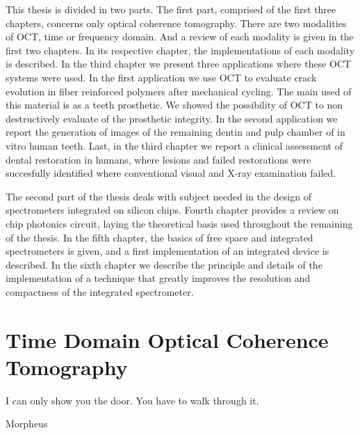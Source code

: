 \documentclass[12pt,twoside,english]{book}
\renewcommand{\~}{\perispomeni}%
\numberwithin{equation}{section}
\numberwithin{figure}{section}
\begin{document}
This thesis is divided in two parts. The first part, comprised of the first three chapters, concerns only optical coherence tomography. There are two modalities of OCT, time or frequency domain. And a review of each modality is given in the first two chapters. In its respective chapter, the implementations of each modality is described. In the third chapter we present three applications where these OCT systems were used. In the first application we use OCT to evaluate crack evolution in fiber reinforced polymers after mechanical cycling. The main used of this material is as a teeth prosthetic. We showed the possibility of OCT to non destructively evaluate of the prosthetic integrity. In the second application we report the generation of images of the remaining dentin and pulp chamber of in vitro human teeth. Last, in the third chapter we report a clinical assessment of dental restoration in humans, where lesions and failed restorations were succesfully identified where conventional visual and X-ray examination failed. 
\thispagestyle{myheadings}

The second part of the thesis deals with subject needed in the design of spectrometers integrated on silicon chips. Fourth chapter provides a review on chip photonics circuit, laying the theoretical basis used throughout the remaining of the thesis. In the fifth chapter, the basics of free space and integrated spectrometers is given, and a first implementation of an integrated device is described. In the sixth chapter we describe the principle and details of the implementation of a technique that greatly improves the resolution and compactness of the integrated spectrometer.

\chapter[Time Domain OCT]{Time Domain Optical Coherence Tomography}
\label{chapter:TDOCT}
\epigraph{I can only show you the door. You have to walk through it.}{Morpheus}
\end{document}
